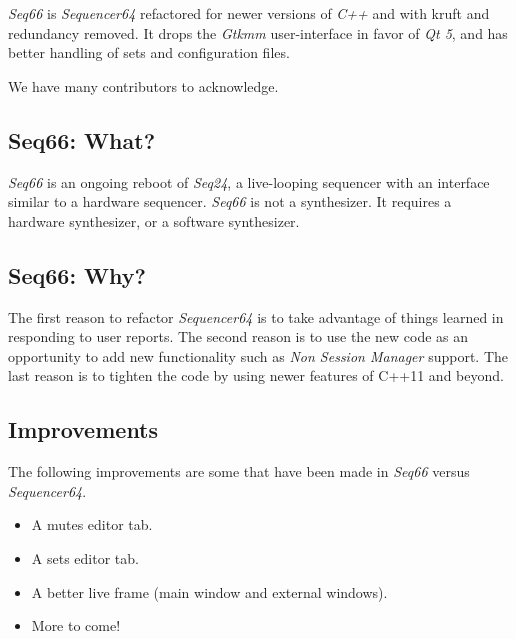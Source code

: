 \documentclass[
 11pt,
 twoside,
 a4paper,
 headinclude,
 footinclude,
 final                                 %
]{article}
\begin{document}
   \textsl{Seq66} is \textsl{Sequencer64} refactored for newer versions of
   \textsl{C++} and with kruft and redundancy removed.  It drops the
   \textsl{Gtkmm} user-interface in favor of \textsl{Qt 5},
   and has better handling of sets and configuration files.

   We have many contributors to acknowledge.

\subsection{Seq66: What?}
\label{subsec:what_is_sequencer66}

   \textsl{Seq66} is an ongoing reboot of \textsl{Seq24},
   a live-looping sequencer with an interface similar to a hardware sequencer.
   \textsl{Seq66} is not a synthesizer.  It requires a hardware
   synthesizer, or a software synthesizer.


\subsection{Seq66: Why?}
\label{subsec:introduction_seq66_vs_others}

   The first reason to refactor \textsl{Sequencer64} is to take advantage of
   things learned in responding to user reports.  The second reason is to use
   the new code as an opportunity to add new functionality such as
   \textsl{Non Session Manager} support.  The last reason is to tighten the
   code by using newer features of C++11 and beyond.

\subsection{Improvements}
\label{subsec:improvements}

   The following improvements are some that have been made in
   \textsl{Seq66} versus \textsl{Sequencer64}.

   \begin{itemize}
      \item A mutes editor tab.
      \item A sets editor tab.
      \item A better live frame (main window and external windows).
      \item More to come!
   \end{itemize}
\end{document}
